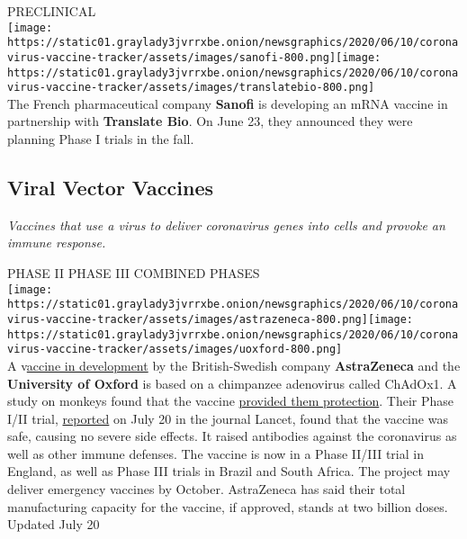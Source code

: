 PRECLINICAL\\
\texttt{[image: https://static01.graylady3jvrrxbe.onion/newsgraphics/2020/06/10/coronavirus-vaccine-tracker/assets/images/sanofi-800.png]}\texttt{[image: https://static01.graylady3jvrrxbe.onion/newsgraphics/2020/06/10/coronavirus-vaccine-tracker/assets/images/translatebio-800.png]}\\
The French pharmaceutical company \textbf{Sanofi} is developing an mRNA
vaccine in partnership with \textbf{Translate Bio}. On June 23, they
announced they were planning Phase I trials in the fall.

\hypertarget{viral-vector-vaccines}{%
\subsection{\texorpdfstring{\textbf{Viral Vector
Vaccines}}{Viral Vector Vaccines}}\label{viral-vector-vaccines}}

\emph{Vaccines that use a virus to deliver coronavirus genes into cells
and provoke an immune response.}

PHASE II PHASE III COMBINED PHASES\\
\texttt{[image: https://static01.graylady3jvrrxbe.onion/newsgraphics/2020/06/10/coronavirus-vaccine-tracker/assets/images/astrazeneca-800.png]}\texttt{[image: https://static01.graylady3jvrrxbe.onion/newsgraphics/2020/06/10/coronavirus-vaccine-tracker/assets/images/uoxford-800.png]}\\
A
v\href{https://www.nytimes3xbfgragh.onion/2020/04/27/world/europe/coronavirus-vaccine-update-oxford.html}{accine
in development} by the British-Swedish company \textbf{AstraZeneca} and
the \textbf{University of Oxford} is based on a chimpanzee adenovirus
called ChAdOx1. A study on monkeys found that the vaccine
\href{https://www.nytimes3xbfgragh.onion/2020/07/30/health/covid-19-vaccine-monkeys.html}{provided
them protection}. Their Phase I/II trial,
\href{https://www.thelancet.com/lancet/article/s0140-6736(20)31604-4}{reported}
on July 20 in the journal Lancet, found that the vaccine was safe,
causing no severe side effects. It raised antibodies against the
coronavirus as well as other immune defenses. The vaccine is now in a
Phase II/III trial in England, as well as Phase III trials in Brazil and
South Africa. The project may deliver emergency vaccines by October.
AstraZeneca has said their total manufacturing capacity for the vaccine,
if approved, stands at two billion doses.\\
Updated July 20

